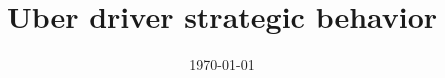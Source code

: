 \documentclass[11pt]{article}
\title{Uber driver strategic behavior}
\date{\today}
\begin{document}
\maketitle	



\onehalfspacing





\end{document}
